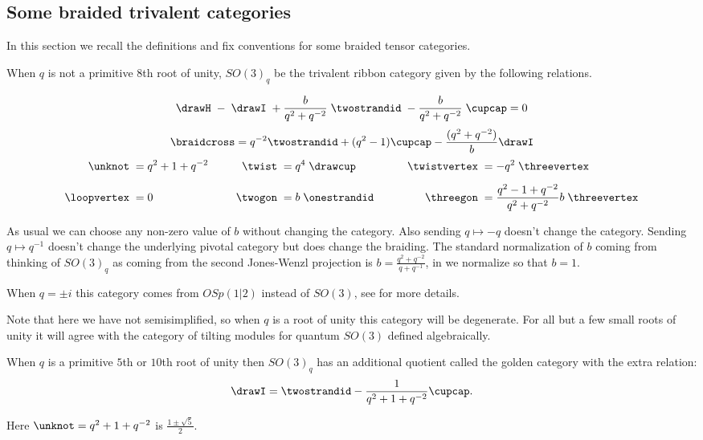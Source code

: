 \documentclass[12pt]{amsart}
\begin{document}
\subsection{Some braided trivalent categories}

In this section we recall the definitions and fix conventions for some braided tensor categories.

\begin{definition}
When $q$ is not a primitive $8$th root of unity, $SO(3)_q$ be the trivalent ribbon category given by the following relations.

$$  \drawH \; - \; \drawI \; + \frac{b}{q^2+q^{-2}}\; \twostrandid \; -  \frac{b}{q^2+q^{-2}}\; \cupcap = 0$$
$$\braidcross  =  q^{-2} \twostrandid + (q^2 - 1) \cupcap - \frac{(q^2+q^{-2})}{b} \drawI$$
\begin{align*}
    \unknot\; &= q^2+1+q^{-2}&\qquad
      \twist\; &= q^4 \;\drawcup&\qquad
        \twistvertex\; &= -q^2\;\threevertex\\[5pt]
    \loopvertex\;&=0&
      \twogon\;&= b\;\onestrandid&
        \threegon\; &= \frac{q^2-1+q^{-2}}{q^2+q^{-2}} b\;\threevertex
\end{align*}
\end{definition}

As usual we can choose any non-zero value of $b$ without changing the category.  Also sending $q \mapsto -q$ doesn't change the category.  Sending $q \mapsto q^{-1}$ doesn't change the underlying pivotal category but does change the braiding.  The standard normalization of $b$ coming from thinking of $SO(3)_q$ as coming from the second Jones-Wenzl projection is $b = \frac{q^2+q^{-2}}{q+q^{-1}}$, in \cite{trivalent} we normalize so that $b=1$.

When $q=\pm i$ this category comes from $OSp(1|2)$ instead of $SO(3)$, see \cite{trivalent} for more details.

Note that here we have not semisimplified, so when $q$ is a root of unity this category will be degenerate.  For all but a few small roots of unity it will agree with the category of tilting modules for quantum $SO(3)$ defined algebraically.

\begin{definition}
When $q$ is a primitive $5$th or $10$th root of unity then $SO(3)_q$ has an additional quotient called the golden category with the extra relation:
$$\drawI = \twostrandid -\frac{1}{q^2+1+q^{-2}} \cupcap.$$

Here $\unknot = q^2+1+q^{-2}$ is $\frac{1\pm \sqrt{5}}{2}$.
\end{definition}
\end{document}

